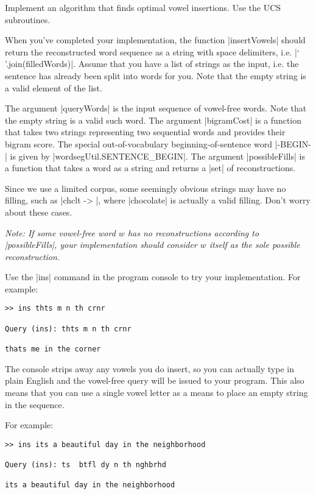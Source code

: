\item {}
Implement an algorithm that finds optimal vowel insertions.  Use the UCS
subroutines.

When you've completed your implementation, the function |insertVowels| should
return the reconstructed word sequence as a string with space delimiters, i.e.
|` '.join(filledWords)|. Assume that you have a list of strings as the input,
i.e. the sentence has already been split into words for you. Note that the empty
string is a valid element of the list.

The argument |queryWords| is the input sequence of vowel-free words.  Note that
the empty string is a valid such word.  The argument |bigramCost| is a function
that takes two strings representing two sequential words and provides their
bigram score.  The special out-of-vocabulary beginning-of-sentence word
|-BEGIN-| is given by |wordsegUtil.SENTENCE_BEGIN|.  The argument
|possibleFills| is a function that takes a word as a string and returns a |set|
of reconstructions.

Since we use a limited corpus, some seemingly obvious strings may have no
filling, such as |chclt -> {}|, where |chocolate| is actually a valid filling.
Don't worry about these cases.

{\em Note: If some vowel-free word $w$ has no reconstructions according to
|possibleFills|, your implementation should consider $w$ itself as the sole
possible reconstruction.

Use the |ins| command in the program console to try your implementation.  For
example:

\begin{lstlisting}
>> ins thts m n th crnr

Query (ins): thts m n th crnr

thats me in the corner
\end{lstlisting}

The console strips away any vowels you do insert, so you can actually type in
plain English and the vowel-free query will be issued to your program.  This
also means that you can use a single vowel letter as a means to place an empty
string in the sequence.

For example:
\begin{lstlisting}
>> ins its a beautiful day in the neighborhood

Query (ins): ts  btfl dy n th nghbrhd

its a beautiful day in the neighborhood
\end{lstlisting}
}
